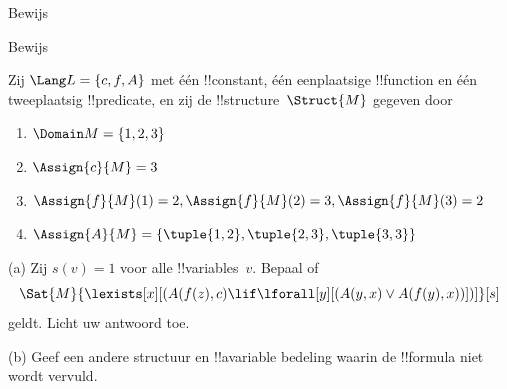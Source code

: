 \documentclass[../../../include/open-logic-section]{subfiles}
\begin{document}

\begin{prob}
  Bewijs 
\end{prob}
\tagendprob


\begin{prob}
  Bewijs 
\end{prob}
\tagendprob

\begin{prob}
Zij $\Lang L = \{c, f, A\}$ met één !!{constant}, één eenplaatsige
!!{function} en één tweeplaatsig !!{predicate}, en zij de
!!{structure}~$\Struct{M}$ gegeven door
\begin{enumerate}
\item $\Domain M = \{1, 2, 3\}$
\item $\Assign{c}{M} = 3$
\item $\Assign{f}{M}(1) = 2, \Assign{f}{M}(2) = 3, \Assign{f}{M}(3) = 2$
\item $\Assign{A}{M} = \{\tuple{1, 2}, \tuple{2, 3}, \tuple{3, 3}\}$
\end{enumerate}
(a) Zij $s(v) = 1$ voor alle !!{variable}s~$v$. Bepaal of
\[
\Sat{M}{\lexists[x][(A(f(z), c) \lif \lforall[y][(A(y, x) \lor A(f(y),
      x))])]}[s]
\]
geldt. Licht uw antwoord toe.

(b) Geef een andere structuur en !!a{variable} bedeling waarin de
!!{formula} niet wordt vervuld.
\end{prob}
\end{document}
